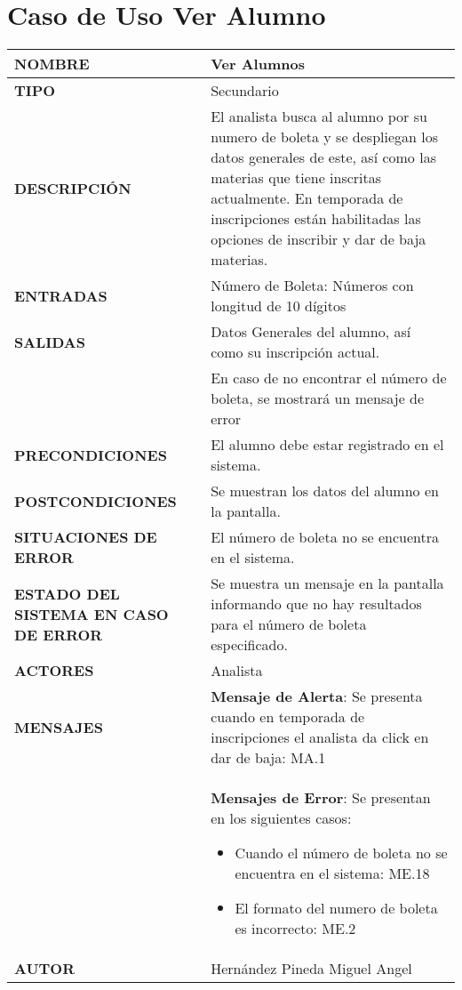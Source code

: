 \newpage
\section{Caso de Uso Ver Alumno}
\begin{longtable}{ | p{6cm} | p{10cm} |}
\hline
\textbf{NOMBRE} & Ver Alumnos\\
\hline
\textbf{TIPO} & Secundario\\
\hline
\textbf{DESCRIPCIÓN} & El analista busca al alumno por su numero de boleta y se despliegan los datos generales de este, así como las materias que tiene inscritas actualmente. En temporada de inscripciones están habilitadas las opciones de inscribir y dar de baja materias.\\
\hline
\textbf{ENTRADAS} & Número de Boleta: Números con longitud de 10 dígitos\\
\hline
\textbf{SALIDAS} & Datos Generales del alumno, así como su inscripción actual.\\ & En caso de no encontrar el número de boleta, se mostrará un mensaje de error\\
\hline
\textbf{PRECONDICIONES} & El alumno debe estar registrado en el sistema.\\
\hline
\textbf{POSTCONDICIONES} & Se muestran los datos del alumno en la pantalla.\\
\hline
\textbf{SITUACIONES DE ERROR} & El número de boleta no se encuentra en el sistema.\\
\hline
\textbf{ESTADO DEL SISTEMA EN CASO DE ERROR} & Se muestra un mensaje en la pantalla informando que no hay resultados para el número de boleta especificado.\\
\hline
\textbf{ACTORES} & Analista\\
\hline
\textbf{MENSAJES} & \textbf{Mensaje de Alerta}: Se presenta cuando en temporada de inscripciones el analista da click en dar de baja: MA.1\\ & \textbf{Mensajes de Error}: Se presentan en los siguientes casos: \begin{itemize}
\item Cuando el número de boleta no se encuentra en el sistema: ME.18
\item El formato del numero de boleta es incorrecto: ME.2
\end{itemize}\\
\hline
\textbf{AUTOR} &  Hernández Pineda Miguel Angel\\
\hline
\end{longtable}
\vspace*{1cm}

